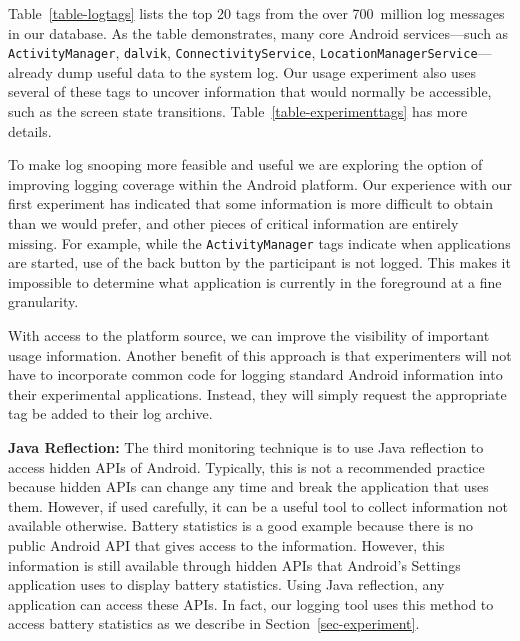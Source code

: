 Table~\ref{table-logtags} lists the top 20 tags from the over 700~million log
messages in our database. As the table demonstrates, many core Android
services---such as \texttt{ActivityManager}, \texttt{dalvik},
\texttt{ConnectivityService}, \texttt{LocationManagerService}---already dump
useful data to the system log. Our usage experiment also uses several of
these tags to uncover information that would normally be accessible, such as
the screen state transitions. Table~\ref{table-experimenttags} has more
details.

To make log snooping more feasible and useful we are exploring the option of
improving logging coverage within the Android platform. Our experience with
our first experiment has indicated that some information is more difficult to
obtain than we would prefer, and other pieces of critical information are
entirely missing. For example, while the \texttt{ActivityManager} tags
indicate when applications are started, use of the back button by the
participant is not logged. This makes it impossible to determine what
application is currently in the foreground at a fine granularity.

With access to the platform source, we can improve the visibility of
important usage information. Another benefit of this approach is that
experimenters will not have to incorporate common code for logging standard
Android information into their experimental applications. Instead, they will
simply request the appropriate tag be added to their log archive.

{\bf Java Reflection:} The third monitoring technique is to use Java reflection
to access hidden APIs of Android. Typically, this is not a recommended practice
because hidden APIs can change any time and break the application that uses
them. However, if used carefully, it can be a useful tool to collect information
not available otherwise. Battery statistics is a good example because there is
no public Android API that gives access to the information. However, this
information is still available through hidden APIs that Android's Settings
application uses to display battery statistics. Using Java reflection, any
application can access these APIs. In fact, our logging tool uses this method to
access battery statistics as we describe in Section~\ref{sec-experiment}.

